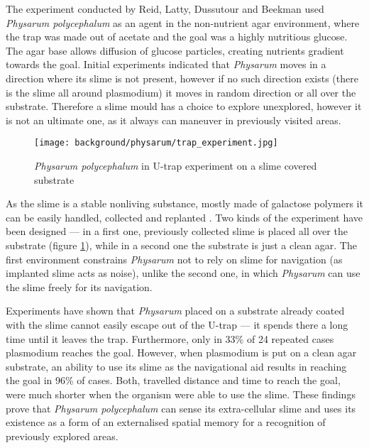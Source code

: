 The experiment conducted by Reid, Latty, Dussutour and Beekman \cite{reid2012slime} used \textit{Physarum polycephalum} as an agent in the non-nutrient agar environment, where the trap was made out of acetate and the goal was a highly nutritious glucose. The agar base allows diffusion of glucose particles, creating nutrients gradient towards the goal. Initial experiments indicated that \textit{Physarum} moves in a direction where its slime is not present, however if no such direction exists (there is the slime all around plasmodium) it moves in random direction or all over the substrate. Therefore a slime mould has a choice to explore unexplored, however it is not an ultimate one, as it always can maneuver in previously visited areas. 

\begin{figure}
  \centering
  \texttt{[image: background/physarum/trap\_experiment.jpg]}
  \caption{\textit{Physarum polycephalum} in U-trap experiment on a slime covered substrate \cite{reid2012slime}}
  \label{figure:bp_trap_experiment}
\end{figure}

As the slime is a stable nonliving substance, mostly made of galactose polymers it can be easily handled, collected and replanted \cite{mccormick1970isolation}. Two kinds of the experiment have been designed --- in a first one, previously collected slime is placed all over the substrate (figure \ref{figure:bp_trap_experiment}), while in a second one the substrate is just a clean agar. The first environment constrains \textit{Physarum} not to rely on slime for navigation (as implanted slime acts as noise), unlike the second one, in which \textit{Physarum} can use the slime freely for its navigation.

Experiments have shown that \textit{Physarum} placed on a substrate already coated with the slime cannot easily escape out of the U-trap --- it spends there a long time until it leaves the trap. Furthermore, only in 33\% of 24 repeated cases plasmodium reaches the goal. However, when plasmodium is put on a clean agar substrate, an ability to use its slime as the navigational aid results in reaching the goal in 96\% of cases. Both, travelled distance and time to reach the goal, were much shorter when the organism were able to use the slime. These findings prove that \textit{Physarum polycephalum} can sense its extra-cellular slime and uses its existence as a form of an externalised spatial memory for a recognition of previously explored areas.


